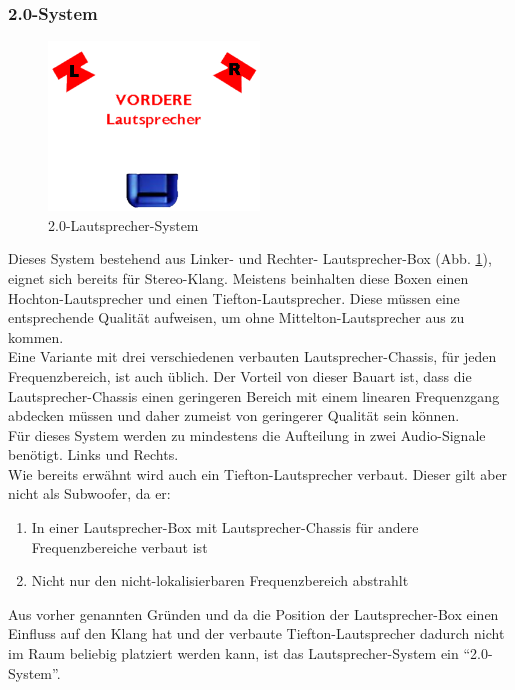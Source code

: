 \subsubsection*{2.0-System}
\begin{figure} [H]
	\centering
	\includegraphics[width=0.5\textwidth]{img/Grundlagen/Mehrweg-Lautsprechersysteme/DOLBYDigital20-cut.jpg}
	\caption{2.0-Lautsprecher-System}
	\label{fig:3.2.3}
\end{figure}

Dieses System bestehend aus Linker- und Rechter- Lautsprecher-Box (Abb. \ref{fig:3.2.3}), eignet sich bereits für Stereo-Klang.
Meistens beinhalten diese Boxen einen Hochton-Lautsprecher und einen Tiefton-Lautsprecher.
Diese müssen eine entsprechende Qualität aufweisen, um ohne Mittelton-Lautsprecher aus zu kommen.\\
Eine Variante mit drei verschiedenen verbauten Lautsprecher-Chassis, für jeden Frequenzbereich, ist auch üblich.
Der Vorteil von dieser Bauart ist, dass die Lautsprecher-Chassis einen geringeren Bereich mit einem linearen Frequenzgang abdecken müssen und daher zumeist von geringerer Qualität sein können.\\
Für dieses System werden zu mindestens die Aufteilung in zwei Audio-Signale benötigt.
Links und Rechts.\\
Wie bereits erwähnt wird auch ein Tiefton-Lautsprecher verbaut.
Dieser gilt aber nicht als Subwoofer, da er:
\begin{enumerate}
	\item In einer Lautsprecher-Box mit Lautsprecher-Chassis für andere Frequenzbereiche verbaut ist
	\item Nicht nur den nicht-lokalisierbaren Frequenzbereich abstrahlt
\end{enumerate}
Aus vorher genannten Gründen und da die Position der Lautsprecher-Box einen Einfluss auf den Klang hat und der verbaute Tiefton-Lautsprecher dadurch nicht im Raum beliebig platziert werden kann, ist das Lautsprecher-System ein \enquote{2.0-System}.\\ \\



